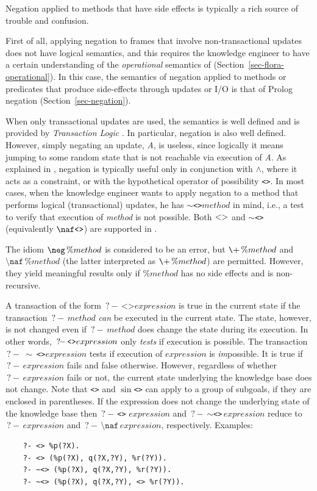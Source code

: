 \documentclass[11pt]{article}
\newcommand{\ERGO}{\mbox{\smaller{\ensuremath{\cal{E}}\smaller{{\sc{RGO}}}}}\xspace}
\newcommand{\FLSYSTEM}{\ERGO}
\newcommand{\query}{\mbox{$\, ?\! - \, $}}                  %
\newcommand{\bs}{\textbackslash}
\newcommand{\PLGNAF}{\mbox{\texttt{\bs}+}\xspace}
\newcommand{\RULELOGNAF}{{\texttt{{\bs}naf}}\xspace}
\newcommand{\RULELOGNEG}{{\texttt{{\bs}neg}}\xspace}
\begin{document}
Negation applied to methods that have side effects is typically a rich source
of trouble and confusion.

First of all, applying negation to frames that involve
non-transactional updates does not have logical semantics, and this
requires the
knowledge engineer to have a certain understanding of the \emph{operational} semantics of
\FLSYSTEM (Section~\ref{sec-flora-operational}).
In this case, the semantics of negation applied to methods or predicates that produce
side-effects through updates  or I/O is that of Prolog negation
(Section~\ref{sec-negation}).

When only transactional updates are used, the semantics is well defined and
is provided by \emph{Transaction Logic}
\cite{trans-chapter-98,trans-tcs94}. In particular, negation is also well
defined. However, simply negating an update, \emph{A}, is useless,
since logically it means jumping to some random state that is not
reachable via execution of \emph{A}.  As explained in
\cite{trans-chapter-98,trans-tcs94}, negation is typically useful only in conjunction
with $\wedge$, where it acts as a constraint, or with the hypothetical
operator of possibility \texttt{<>}.  In most cases, when the knowledge
engineer
wants to apply negation to a method that performs logical (transactional)
updates, he has \texttt{$\sim$<>}$method$  in mind, i.e., a test to
verify that execution of \emph{method}  is not possible.
Both $\tt<>$ and \texttt{$\sim$<>} (equivalently $\tt\RULELOGNAF \texttt{<>}$) are supported in \FLSYSTEM.

The idiom ${\tt \RULELOGNEG}\,\%method$ is considered to be an error, but
$\PLGNAF\,\%method$ and $\RULELOGNAF\,\%method$ (the latter interpreted as
$\PLGNAF\,\%method$) are permitted. However, they yield meaningful results only
if $\%method$ has no side effects and is non-recursive.

A transaction of the form $\query \texttt{<>} expression$ is true in the current
state if the transaction $\query method$ \emph{can} be executed in the current
state. The state, however, is not changed even if  $\query method$
does change the state during its execution. In other words, $\texttt{\query <>}
expression$ only \emph{tests} if execution is possible.
The transaction \texttt{\query} \texttt{$\sim$ <>}$expression$ tests if execution of
$expression$ is \emph{im}possible. It is true if $\query expression$ fails
and false otherwise. However, regardless of whether $\query expression$
fails or not, the current state underlying the knowledge base does not
change.
Note that \texttt{<>} and \texttt{$\sin$<>} can apply to a group of
subgoals, if they are enclosed in parentheses.  If the expression does not
change the underlying state of the knowledge base then
\texttt{\query <>} $expression$ and \query\texttt{$\sim$<>}\,$expression$ reduce to
$\query expression$ and $\query \RULELOGNAF\,expression$, respectively.
Examples:
\begin{verbatim}
    ?- <> %p(?X).
    ?- <> (%p(?X), q(?X,?Y), %r(?Y)).
    ?- ~<> (%p(?X), q(?X,?Y), %r(?Y)).
    ?- ~<> (%p(?X), q(?X,?Y), <> %r(?Y)).
\end{verbatim}
\end{document}
